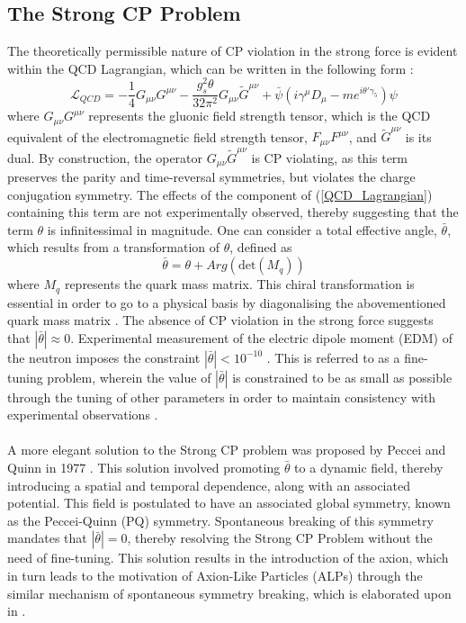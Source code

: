 \subsection{The Strong CP Problem}\label{StrongCPProb}
The theoretically permissible nature of CP violation in the strong force is evident within the QCD Lagrangian, which can be written in the following form \cite{Michael:920}:
\begin{equation}\label{QCD_Lagrangian}
    \mathcal{L}_{QCD} = -\frac{1}{4}G_{\mu\nu}G^{\mu\nu}-\frac{g_{s}^{2}\theta}{32\pi^{2}}G_{\mu\nu}\tilde{G}^{\mu\nu}+\bar{\psi}(i\gamma^{\mu}D_{\mu}-me^{i\theta'\gamma_{5}})\psi
\end{equation}
where $G_{\mu\nu}G^{\mu\nu}$ represents the gluonic field strength tensor, which is the QCD equivalent of the electromagnetic field strength tensor, $F_{\mu\nu}F^{\mu\nu}$, and $\tilde{G}^{\mu\nu}$ is its dual. By construction, the operator $G_{\mu\nu}\tilde{G}^{\mu\nu}$ is CP violating, as this term preserves the parity and time-reversal symmetries, but violates the charge conjugation symmetry. The effects of the component of (\ref{QCD_Lagrangian}) containing this term are not experimentally observed, thereby suggesting that the term $\theta$ is infinitessimal in magnitude. One can consider a total effective angle, $\bar{\theta}$, which results from
a transformation of $\theta$, defined as
\begin{equation}
    \bar{\theta} = \theta + Arg(\text{det}(M_{q}))
\end{equation} 
where $M_{q}$ represents the quark mass matrix. This chiral transformation is essential in order to go to a physical basis by diagonalising the abovementioned quark mass matrix \cite{Peccei_2008}.
The absence of CP violation in the strong force suggests that $|\bar{\theta}|\approx 0$. Experimental measurement of the electric dipole moment (EDM) of the neutron imposes the constraint $|\bar{\theta}| < 10^{-10}$ \cite{PhysRevLett.124.081803}. This is referred to as a fine-tuning problem, wherein the value of $|\bar{\theta}|$ is constrained to be as small as possible
through the tuning of other parameters in order to maintain consistency with experimental observations \cite{https://doi.org/10.48550/arxiv.hep-ph/9704427}.\\
\\
A more elegant solution to the Strong CP problem was proposed by Peccei and Quinn in 1977 \cite{article}. This solution involved promoting $\bar{\theta}$ to a dynamic field, thereby introducing a spatial and temporal dependence, along with an associated
potential. This field is postulated to have an associated global symmetry, known as the Peccei-Quinn (PQ) symmetry. Spontaneous breaking of this symmetry mandates that $|\bar{\theta}| = 0$, thereby resolving the Strong CP Problem without the need of fine-tuning. This solution 
results in the introduction of the axion, which in turn leads to the motivation of Axion-Like Particles (ALPs) through the similar mechanism of spontaneous symmetry breaking, which is elaborated upon in \cite{Beekman_2019}.

